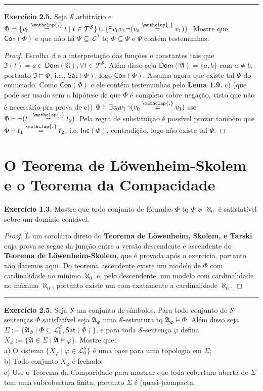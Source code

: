 \documentclass[11pt]{article}
\theoremstyle{definition}
\newcommand{\mc}[1]{\mathcal{#1}}
\newcommand{\mf}[1]{\mathfrak{#1}}
\newcommand{\msf}[1]{\mathsf{#1}}
\newcommand\overtext[2]{\stackrel{\mathclap{\normalfont\mbox{#1}}}{#2}}
\begin{document}
\hrule

\textbf{Exercício 2.5.} Seja $\mc{S}$ arbitrário e $\Phi=\{v_0\overtext{.}{=}t\mid t\in\mc{T}^\mc{S}\}\cup\{\exists v_0v_1\neg(v_0\overtext{.}{=}v_1)\}$. Mostre que $\msf{Con}(\Phi)$ e que não há $\Psi\subseteq\mc{L}^\mc{S}$ tq $\Phi\subseteq\Psi$ e $\Psi$ contém testemunhas.

\begin{proof}
    Escolha $\beta$ e a interpretação das funções e constantes tais que $\mf{I}(t)=a\in\msf{Dom}(\mf{A}),\forall t\in\mc{T}^\mc{S}$. Além disso seja $\msf{Dom}(\mf{A})=\{a,b\}$ com $a\ne b$, portanto $\mf{I}\vDash\Phi$, i.e., $\msf{Sat}(\Phi)$, logo $\msf{Con}(\Phi)$. Assuma agora que existe tal $\Psi$ do enunciado. Como $\msf{Con}(\Phi)$ e ele contém testemunhas pelo \textbf{Lema 1.9.} c) (que pode ser usado sem a hipótese de que $\Phi$ é completo sobre negação, visto que não é necessário pra prova de c)) $\Phi\vdash\exists v_0v_1\neg(v_0\overtext{.}{=}v_1)$ sse $\Phi\vdash\neg(t_1\overtext{.}{=}t_2)$. Pela regra de substituição é possível provar também que $\Phi\vdash t_1\overtext{.}{=}t_2$, i.e. $\msf{Inc}(\Phi)$, contradição, logo não existe tal $\Psi$.
\end{proof}

\section{O Teorema de Löwenheim-Skolem e o Teorema da Compacidade}

\textbf{Exercício 1.3.} Mostre que todo conjunto de fórmulas $\Phi$ tq $\Phi\succeq\aleph_0$ é satisfatível sobre um domínio contável.

\begin{proof}
    É um corolário direto do \textbf{Teorema de Löwenheim, Skolem, e Tarski} cuja prova se segue da junção entre a versão descendente e ascendente do \textbf{Teorema de Löwenheim-Skolem}, que é provada após o exercício, portanto não daremos aqui. Do teorema ascendente existe um modelo de $\Phi$ com cardinalidade no mínimo $\aleph_0$ e, pelo descendente, um modelo com cardinalidade no máximo $\aleph_0$, portanto existe um com exatamente a cardinalidade $\aleph_0$.
\end{proof}

\hrule

\textbf{Exercício 2.5.} Seja $\mc{S}$ um conjunto de símbolos. Para todo conjunto de $\mc{S}$-sentenças $\Phi$ satisfatível seja $\mf{A}_\Phi$ uma $\mc{S}$-estrutura tq $\mf{A}_\Phi\vDash\Phi$. Além disso seja $\Sigma:=\{\mf{A}_\Phi\mid\Phi\subseteq\mc{L}^\mc{S}_0,\msf{Sat}(\Phi)\}$, e para toda $\mc{S}$-sentença $\varphi$ defina $X_\varphi:=\{\mf{A}\in\Sigma\mid\mf{A}\vDash\varphi\}$. Mostre que:\\
a) O sistema $\{X_\varphi\mid\varphi\in\mc{L}^\mc{S}_0\}$ é uma base para uma topologia em $\Sigma$;\\
b) Todo conjunto $X_\varphi$ é fechado;\\
c) Use o Teorema da Compacidade para mostrar que toda cobertura aberta de $\Sigma$ tem uma subcobertura finita, portanto $\Sigma$ é (quasi-)compacta.
\end{document}
